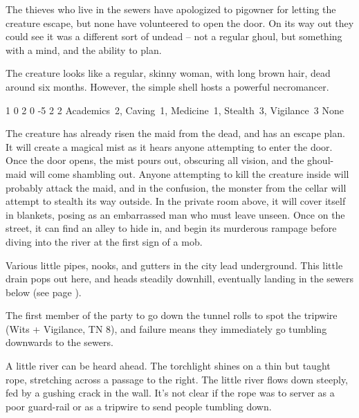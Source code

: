 \begin{multicols}{2}
The thieves who live in the sewers have apologized to \gls{pigowner} for letting the creature escape, but none have volunteered to open the door.
On its way out they could see it was a different sort of undead -- not a regular ghoul, but something with a mind, and the ability to plan.

The creature looks like a regular, skinny woman, with long brown hair, dead around six months.
However, the simple shell hosts a powerful necromancer.


  {1}%
  {0}%
  {{2}%
  {0}%
  {-5}}%
  {2}%
  {2}%
  {Academics~2, Caving~1, Medicine~1, Stealth~3, Vigilance~3
  }%
  {None}%
  {}

The creature has already risen the maid from the dead, and has an escape plan.
It will create a magical mist as it hears anyone attempting to enter the door.
Once the door opens, the mist pours out, obscuring all vision, and the ghoul-maid will come shambling out.
Anyone attempting to kill the creature inside will probably attack the maid, and in the confusion, the monster from the cellar will attempt to stealth its way outside.
In the private room above, it will cover itself in blankets, posing as an embarrassed man who must leave unseen.
Once on the street, it can find an alley to hide in, and begin its murderous rampage before diving into the river at the first sign of a mob.


\label{runoff}

Various little pipes, nooks, and gutters in the city lead underground.
This little drain pops out here, and heads steadily downhill, eventually landing in the sewers below (see page \pageref{slidein}).

The first member of the party to go down the tunnel rolls to spot the tripwire (Wits + Vigilance, TN 8), and failure means they immediately go tumbling downwards to the sewers.

\begin{boxtext}

  A little river can be heard ahead.
  The torchlight shines on a thin but taught rope, stretching across a passage to the right.
  The little river flows down steeply, fed by a gushing crack in the wall.
  It's not clear if the rope was to server as a poor guard-rail or as a tripwire to send people tumbling down.


\end{boxtext}
\end{multicols}
